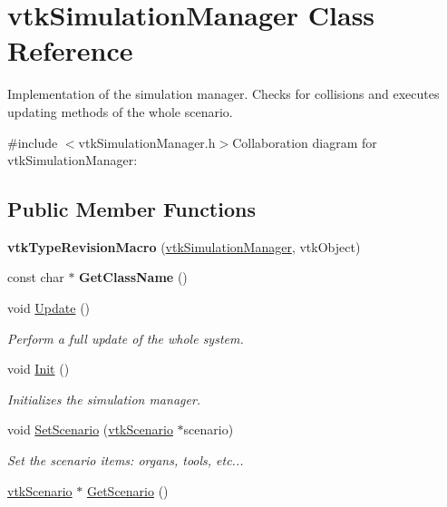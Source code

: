 \hypertarget{classvtkSimulationManager}{
\section{vtkSimulationManager Class Reference}
\label{classvtkSimulationManager}
}


Implementation of the simulation manager. Checks for collisions and executes updating methods of the whole scenario.  


{\ttfamily \#include $<$vtkSimulationManager.h$>$}Collaboration diagram for vtkSimulationManager:\subsection*{Public Member Functions}
\begin{DoxyCompactItemize}
\item 
\hypertarget{classvtkSimulationManager_a94057736fabea1165abdf718d60de5e3}{
{\bfseries vtkTypeRevisionMacro} (\hyperlink{classvtkSimulationManager}{vtkSimulationManager}, vtkObject)}
\label{classvtkSimulationManager_a94057736fabea1165abdf718d60de5e3}

\item 
\hypertarget{classvtkSimulationManager_ade7652c3dc0ca2a0c1d80bf2a3a8dc16}{
const char $\ast$ {\bfseries GetClassName} ()}
\label{classvtkSimulationManager_ade7652c3dc0ca2a0c1d80bf2a3a8dc16}

\item 
void \hyperlink{classvtkSimulationManager_a2d78cb22ac71b2e1e1f549c2df509a60}{Update} ()
\begin{DoxyCompactList}\small\item\em Perform a full update of the whole system. \item\end{DoxyCompactList}\item 
\hypertarget{classvtkSimulationManager_a701a5b97305c54f3662d0c931a03b58a}{
void \hyperlink{classvtkSimulationManager_a701a5b97305c54f3662d0c931a03b58a}{Init} ()}
\label{classvtkSimulationManager_a701a5b97305c54f3662d0c931a03b58a}

\begin{DoxyCompactList}\small\item\em Initializes the simulation manager. \item\end{DoxyCompactList}\item 
void \hyperlink{classvtkSimulationManager_a44b0a480f8acf9ca9f5d38e93b387fd7}{SetScenario} (\hyperlink{classvtkScenario}{vtkScenario} $\ast$scenario)
\begin{DoxyCompactList}\small\item\em Set the scenario items: organs, tools, etc... \item\end{DoxyCompactList}\item 
\hypertarget{classvtkSimulationManager_a7927a4e923f8c1b2039ea27f3684e34b}{
\hyperlink{classvtkScenario}{vtkScenario} $\ast$ \hyperlink{classvtkSimulationManager_a7927a4e923f8c1b2039ea27f3684e34b}{GetScenario} ()}
\label{classvtkSimulationManager_a7927a4e923f8c1b2039ea27f3684e34b}


\end{DoxyCompactItemize}
